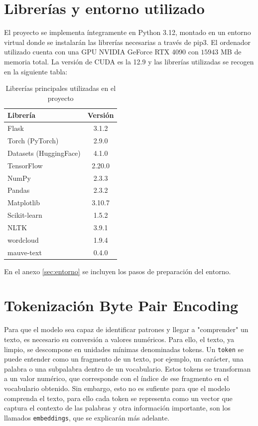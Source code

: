 \documentclass[11pt]{book}
\begin{document}
\section{Librerías y entorno utilizado}
El proyecto se implementa íntegramente en Python 3.12, montado en un entorno virtual donde se instalarán las librerías necesarias a través de pip3. 
El ordenador utilizado cuenta con una GPU NVIDIA GeForce RTX 4090 con $15943$ MB de memoria total. 
La versión de CUDA es la 12.9 y las librerías utilizadas se recogen en la siguiente tabla:

\begin{table}[h]
\centering
\caption{Librerías principales utilizadas en el proyecto}
\label{tab:librerias_principales}
\begin{tabular}{l c}
\toprule
\textbf{Librería} & \textbf{Versión} \\
\midrule
Flask & 3.1.2 \\
Torch (PyTorch) & 2.9.0 \\
Datasets (HuggingFace) & 4.1.0 \\
TensorFlow & 2.20.0 \\
NumPy & 2.3.3 \\
Pandas & 2.3.2 \\
Matplotlib & 3.10.7 \\
Scikit-learn & 1.5.2 \\
NLTK & 3.9.1 \\
wordcloud & 1.9.4\\
mauve-text & 0.4.0 \\
\bottomrule
\end{tabular}
\end{table}

En el anexo \ref{sec:entorno} se incluyen los pasos de preparación del entorno.

\section{Tokenización Byte Pair Encoding}
Para que el modelo sea capaz de identificar patrones y llegar a "comprender" un texto, es necesario su conversión a valores numéricos. Para ello, el texto, ya limpio, se descompone en unidades mínimas denominadas tokens. Un \texttt{token} se puede entender como un fragmento de un texto, por ejemplo, un carácter, una palabra o una subpalabra dentro de un vocabulario. Estos tokens se transforman a un valor numérico, que corresponde con el índice de ese fragmento en el vocabulario obtenido. Sin embargo, esto no es sufiente para que el modelo comprenda el texto, para ello cada token se representa como un vector que captura el contexto de las palabras y otra información importante, son los llamados \texttt{embeddings}, que se explicarán más adelante.
\end{document}
